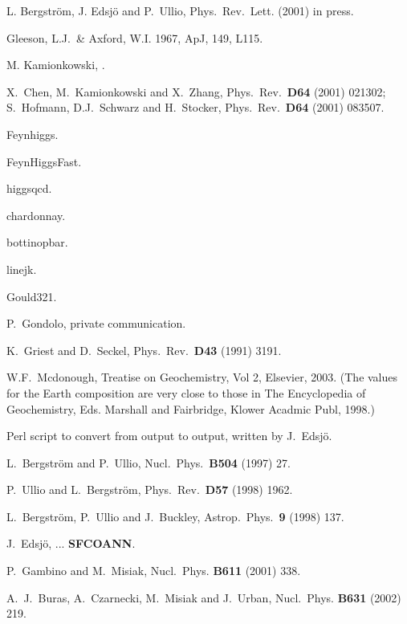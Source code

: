\begin{thebibliography}{99}
L. Bergstr\"om, J. Edsj\"o and P.~Ullio, 
Phys.\ Rev.\ Lett. (2001) in press.


 Gleeson, L.J.\ \&
   Axford, W.I. 1967, ApJ, {149}, L115.

M. Kamionkowski, .

X.~Chen, M.~Kamionkowski and X.~Zhang, Phys.\ Rev.\ {\bfseries D64}
(2001) 021302;
S.~Hofmann, D.J.~Schwarz and H.~Stocker, Phys.\ Rev.\ {\bfseries D64}
(2001) 083507.

Feynhiggs.

FeynHiggsFast.

higgsqcd.

chardonnay.

bottinopbar.

linejk.

Gould321.

P.~Gondolo, private communication.

K.~Griest and D.~Seckel, Phys.\ Rev.\ {\bf D43} (1991) 3191.

W.F.~Mcdonough, Treatise on Geochemistry, Vol 2, Elsevier, 2003. (The values for the Earth composition are very close to those in The Encyclopedia of
Geochemistry, Eds. Marshall and Fairbridge, Klower Acadmic Publ,
1998.)

Perl script  to convert from  output
to  output, written by J.~Edsj\"o.

L.~Bergstr\"om and P.~Ullio, Nucl.\ Phys.\ {\bfseries B504} (1997) 27.

P.~Ullio and L.~Bergstr\"om, Phys.\ Rev.\ {\bfseries D57} (1998) 1962.

L.~Bergstr\"om, P.~Ullio and J.~Buckley, Astrop.\ Phys.\ {\bfseries 9}
(1998) 137.

J.~Edsj\"o, ...
{\bfseries SFCOANN}.

 P.~Gambino and M.~Misiak, Nucl.~Phys. {\bf B611} (2001) 338.

 A.~J.~Buras, A.~Czarnecki, M.~Misiak and J.~Urban,  Nucl.~Phys.  {\bf B631} (2002) 219.


\end{thebibliography}
